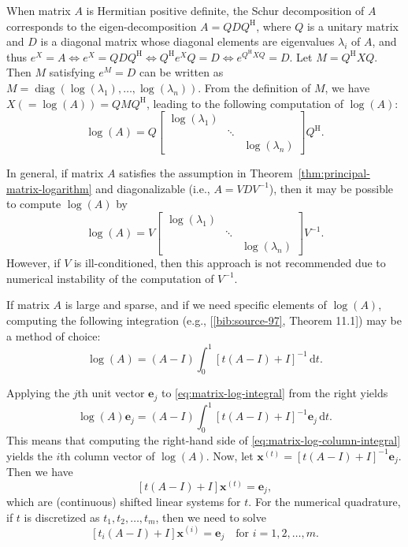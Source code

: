 {When matrix $A$ is Hermitian positive definite, the Schur decomposition of $A$ corresponds to the eigen-decomposition $A=QDQ^{\mathrm H}$, where $Q$ is a unitary matrix and $D$ is a diagonal matrix whose diagonal elements are eigenvalues $\lambda_i$ of $A$, and thus $e^X=A\Leftrightarrow e^X=QDQ^{\mathrm H}\Leftrightarrow Q^{\mathrm H}e^XQ=D\Leftrightarrow e^{Q^{\mathrm H}XQ}=D$. Let $M=Q^{\mathrm H}XQ$. Then $M$ satisfying $e^M=D$ can be written as $M=\operatorname{diag}(\log(\lambda_1),\ldots,\log(\lambda_n))$. From the definition of $M$, we have $X(=\log(A))=QMQ^{\mathrm H}$, leading to the following computation of $\log(A)$:}
\[\log(A)=Q\begin{bmatrix}\log(\lambda_1)&&\\&\ddots&\\&&\log(\lambda_n)\end{bmatrix}Q^{\mathrm H}.\]

{In general, if matrix $A$ satisfies the assumption in Theorem~\ref{thm:principal-matrix-logarithm} and diagonalizable (i.e., $A=VDV^{-1}$), then it may be possible to compute $\log(A)$ by}
\[\log(A)=V\begin{bmatrix}\log(\lambda_1)&&\\&\ddots&\\&&\log(\lambda_n)\end{bmatrix}V^{-1}.\]
{However, if $V$ is ill-conditioned, then this approach is not recommended due to numerical instability of the computation of $V^{-1}$.}

{If matrix $A$ is large and sparse, and if we need specific elements of $\log(A)$, computing the following integration (e.g., [\hyperref[bib:source-97]{\ref*{bib:source-97}}, Theorem 11.1]) may be a method of choice:}
\begin{equation}\label{eq:matrix-log-integral}\log(A)=(A-I)\int_0^1[t(A-I)+I]^{-1}\,\mathrm{d}t.\end{equation}

{Applying the $j$th unit vector $\boldsymbol{e}_j$ to \eqref{eq:matrix-log-integral} from the right yields}
\begin{equation}\label{eq:matrix-log-column-integral}\log(A)\boldsymbol{e}_j=(A-I)\int_0^1[t(A-I)+I]^{-1}\boldsymbol{e}_j\,\mathrm{d}t.\end{equation}
{This means that computing the right-hand side of \eqref{eq:matrix-log-column-integral} yields the $i$th column vector of $\log(A)$. Now, let $\boldsymbol{x}^{(t)}=[t(A-I)+I]^{-1}\boldsymbol{e}_j$. Then we have}
\[[t(A-I)+I]\boldsymbol{x}^{(t)}=\boldsymbol{e}_j,\]
{which are (continuous) shifted linear systems for $t$. For the numerical quadrature, if $t$ is discretized as $t_1,t_2,\ldots,t_m$, then we need to solve}
\begin{equation}\label{eq:matrix-log-quadrature-systems}[t_i(A-I)+I]\boldsymbol{x}^{(i)}=\boldsymbol{e}_j\quad\text{for }i=1,2,\ldots,m.\end{equation}


